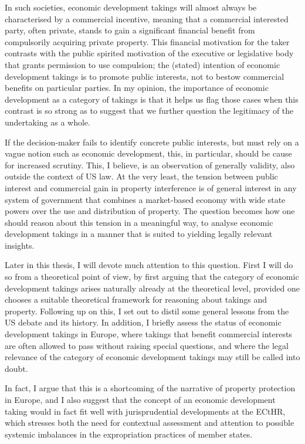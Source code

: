 In such societies, economic development takings will almost always be characterised by a commercial incentive, meaning that a commercial interested party, often private, stands to gain a significant financial benefit from compulsorily acquiring private property. This financial motivation for the taker contrasts with the public spirited motivation of the executive or legislative body that grants permission to use compulsion; the (stated) intention of economic development takings is to promote public interests, not to bestow commercial benefits on particular parties. In my opinion, the  importance of economic development as a category of takings is that it helps us flag those cases when this contrast is so strong as to suggest that we further question the legitimacy of the undertaking as a whole.

If the decision-maker fails to identify concrete public interests, but must rely on a vague notion such as economic development, this, in particular, should be cause for increased scrutiny. This, I believe, is an observation of generally validity, also outside the context of US law. At the very least, the tension between public interest and commercial gain in property interference is of general interest in any system of government that combines a market-based economy with wide state powers over the use and distribution of property. The question becomes how one should reason about this tension in a meaningful way, to analyse economic development takings in a manner that is suited to yielding legally relevant insights.

Later in this thesis, I will devote much attention to this question. First I will do so from a theoretical point of view, by first arguing that the category of economic development takings arises naturally already at the theoretical level, provided one chooses a suitable theoretical framework for reasoning about takings and property. Following up on this, I set out to distil some general lessons from the US debate and its history. In addition, I briefly assess the status of economic development takings in Europe, where takings that benefit commercial interests are often allowed to pass without raising special questions, and where the legal relevance of the category of economic development takings may still be called into doubt.

In fact, I argue that this is a shortcoming of the narrative of property protection in Europe, and I also suggest that the concept of an economic development taking would in fact fit well with jurisprudential developments at the ECtHR, which stresses both the need for contextual assessment and attention to possible systemic imbalances in the expropriation practices of member states.

